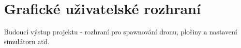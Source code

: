 \chapter{Grafické uživatelské rozhraní} \label{chap:gui}
    Budoucí výstup projektu - rozhraní pro spawnování dronu, plošiny a nastavení simulátoru atd.